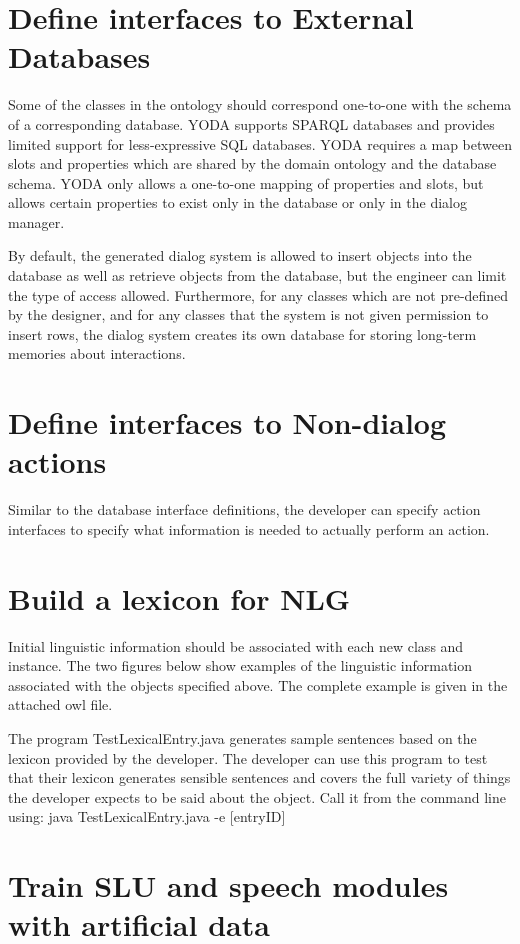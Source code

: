 \documentclass[10pt]{article}
\begin{document}
\section {Define interfaces to External Databases}
Some of the classes in the ontology should correspond one-to-one with the schema of a corresponding database.
YODA supports SPARQL databases and provides limited support for less-expressive SQL databases.
YODA requires a map between slots and properties which are shared by the domain ontology and the database schema.
YODA only allows a one-to-one mapping of properties and slots, but allows certain properties to exist only in the database or only in the dialog manager.

By default, the generated dialog system is allowed to insert objects into the database as well as retrieve objects from the database, but the engineer can limit the type of access allowed.
Furthermore, for any classes which are not pre-defined by the designer, and for any classes that the system is not given permission to insert rows, the dialog system creates its own database for storing long-term memories about interactions.

\section {Define interfaces to Non-dialog actions}
Similar to the database interface definitions, the developer can specify action interfaces to specify what information is needed to actually perform an action.

\section {Build a lexicon for NLG}
Initial linguistic information should be associated with each new class and instance.
The two figures below show examples of the linguistic information associated with the objects specified above.
The complete example is given in the attached owl file.

The program TestLexicalEntry.java generates sample sentences based on the lexicon provided by the developer.
The developer can use this program to test that their lexicon generates sensible sentences and covers the full variety of things the developer expects to be said about the object.
Call it from the command line using: java TestLexicalEntry.java -e [entryID]


\section {Train SLU and speech modules with artificial data}
\end{document}
